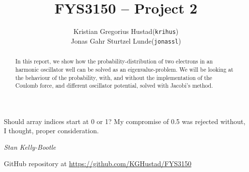 \documentclass[a4paper]{article}
\begin{document}
\title{FYS3150 -- Project 2}
\author{
    \begin{tabular}{r l}
        Kristian Gregorius Hustad & (\texttt{krihus})\\
        Jonas Gahr Sturtzel Lunde & (\texttt{jonassl})
    \end{tabular}}

\maketitle



\setlength{\epigraphwidth}{0.75\textwidth}
\renewcommand{\epigraphflush}{center}
\renewcommand{\beforeepigraphskip}{50pt}
\renewcommand{\afterepigraphskip}{100pt}
\renewcommand{\epigraphsize}{\normalsize}

\epigraph{Should array indices start at 0 or 1?  My compromise of 0.5 was rejected without, I thought, proper consideration.}
{\textit{Stan Kelly-Bootle}}


\begin{abstract}
\noindent
In this report, we show how the probability-distribution of two electrons in an harmonic oscillator well can be solved as an eigenvalue-problem. We will be looking at the behaviour of the probability, with, and without the implementation of the Coulomb force, and different oscillator potential, solved with Jacobi's method.
\end{abstract}

\vfill


\begin{center}
    GitHub repository at \url{https://github.com/KGHustad/FYS3150}
\end{center}

\newpage

\newcommand{\half}{\frac{1}{2}}
\newcommand{\dx}{{\Delta x}}
\newcommand{\bigO}{{\mathcal{O}}}
\newcommand{\rhomax}{{\rho_{\mathrm{max}}}}
\end{document}
